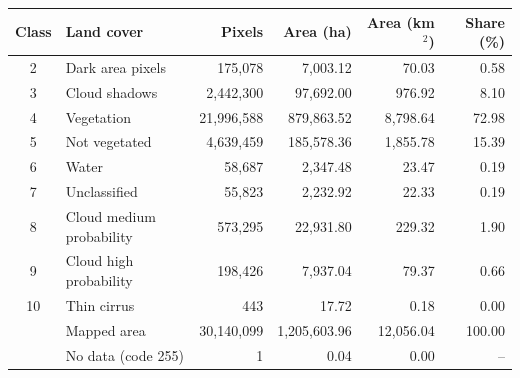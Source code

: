 \begin{tabular}{clrrrr}
\toprule
Class & Land cover & Pixels & Area (ha) & Area (km$^2$) & Share (\%) \\
\midrule
2 & Dark area pixels & 175,078 & 7,003.12 & 70.03 & 0.58 \\
3 & Cloud shadows & 2,442,300 & 97,692.00 & 976.92 & 8.10 \\
4 & Vegetation & 21,996,588 & 879,863.52 & 8,798.64 & 72.98 \\
5 & Not vegetated & 4,639,459 & 185,578.36 & 1,855.78 & 15.39 \\
6 & Water & 58,687 & 2,347.48 & 23.47 & 0.19 \\
7 & Unclassified & 55,823 & 2,232.92 & 22.33 & 0.19 \\
8 & Cloud medium probability & 573,295 & 22,931.80 & 229.32 & 1.90 \\
9 & Cloud high probability & 198,426 & 7,937.04 & 79.37 & 0.66 \\
10 & Thin cirrus & 443 & 17.72 & 0.18 & 0.00 \\
\midrule
 & Mapped area & 30,140,099 & 1,205,603.96 & 12,056.04 & 100.00 \\
 & No data (code 255) & 1 & 0.04 & 0.00 & -- \\
\bottomrule
\end{tabular}
